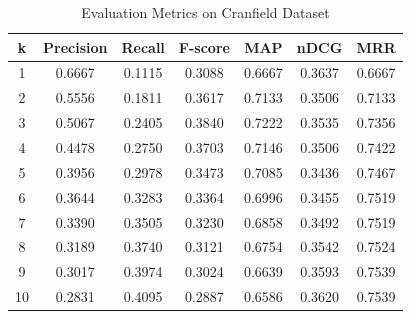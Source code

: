 \documentclass{article}
\begin{document}
\begin{table}[h!]
\centering
\caption{Evaluation Metrics on Cranfield Dataset}
\begin{tabular}{c|c c c|c c c}
\hline
k & Precision & Recall & F-score & MAP & nDCG & MRR \\
\hline
1  & 0.6667 & 0.1115 & 0.3088 & 0.6667 & 0.3637 & 0.6667 \\
2  & 0.5556 & 0.1811 & 0.3617 & 0.7133 & 0.3506 & 0.7133 \\
3  & 0.5067 & 0.2405 & 0.3840 & 0.7222 & 0.3535 & 0.7356 \\
4  & 0.4478 & 0.2750 & 0.3703 & 0.7146 & 0.3506 & 0.7422 \\
5  & 0.3956 & 0.2978 & 0.3473 & 0.7085 & 0.3436 & 0.7467 \\
6  & 0.3644 & 0.3283 & 0.3364 & 0.6996 & 0.3455 & 0.7519 \\
7  & 0.3390 & 0.3505 & 0.3230 & 0.6858 & 0.3492 & 0.7519 \\
8  & 0.3189 & 0.3740 & 0.3121 & 0.6754 & 0.3542 & 0.7524 \\
9  & 0.3017 & 0.3974 & 0.3024 & 0.6639 & 0.3593 & 0.7539 \\
10 & 0.2831 & 0.4095 & 0.2887 & 0.6586 & 0.3620 & 0.7539 \\
\hline
\end{tabular}
\end{table}
\end{document}

